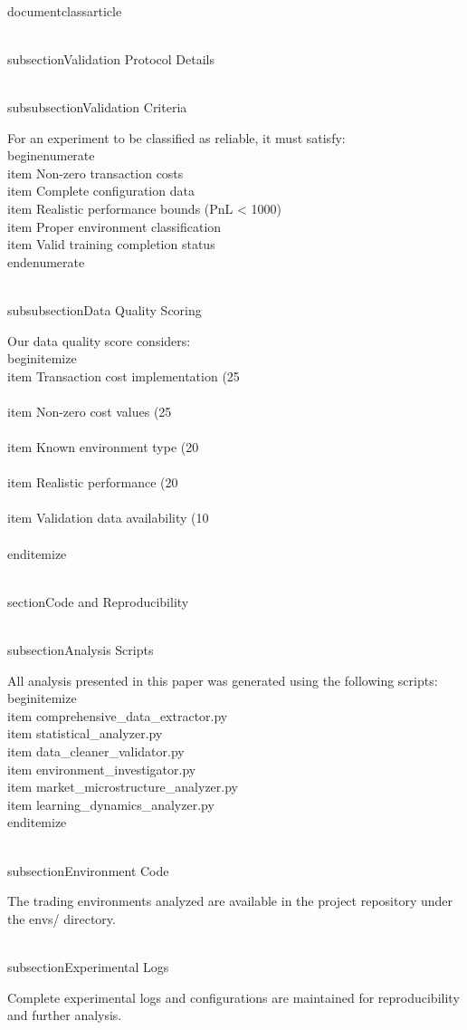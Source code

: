 \\documentclass{article}
\begin{document}
\\subsection{Validation Protocol Details}

\\subsubsection{Validation Criteria}

For an experiment to be classified as reliable, it must satisfy:
\\begin{enumerate}
\\item Non-zero transaction costs
\\item Complete configuration data
\\item Realistic performance bounds (PnL < 1000)
\\item Proper environment classification
\\item Valid training completion status
\\end{enumerate}

\\subsubsection{Data Quality Scoring}

Our data quality score considers:
\\begin{itemize}
\\item Transaction cost implementation (25\\%
\\item Non-zero cost values (25\\%
\\item Known environment type (20\\%
\\item Realistic performance (20\\%
\\item Validation data availability (10\\%
\\end{itemize}

\\section{Code and Reproducibility}

\\subsection{Analysis Scripts}

All analysis presented in this paper was generated using the following scripts:
\\begin{itemize}
\\item comprehensive\_data\_extractor.py
\\item statistical\_analyzer.py
\\item data\_cleaner\_validator.py
\\item environment\_investigator.py
\\item market\_microstructure\_analyzer.py
\\item learning\_dynamics\_analyzer.py
\\end{itemize}

\\subsection{Environment Code}

The trading environments analyzed are available in the project repository under the envs/ directory.

\\subsection{Experimental Logs}

Complete experimental logs and configurations are maintained for reproducibility and further analysis.

\
\end{document}

